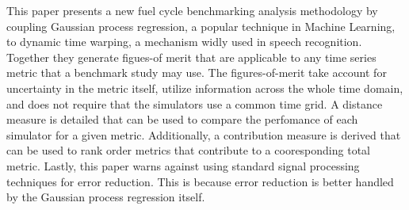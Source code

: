 This paper presents a new fuel cycle benchmarking analysis methodology
by coupling Gaussian process regression, a popular technique in Machine 
Learning, to dynamic time warping, a mechanism widly used in speech 
recognition. Together they generate figues-of merit that are applicable to
any time series metric that a benchmark study may use. The figures-of-merit
take account for uncertainty in the metric itself, utilize information
across the whole time domain, and does not require that the simulators
use a common time grid. A distance measure is detailed that can be used to 
compare the perfomance of each simulator for a given metric. Additionally, 
a contribution measure is derived that can be used to rank order metrics
that contribute to a cooresponding total metric. Lastly, this paper 
warns against using standard signal processing techniques for error reduction.
This is because error reduction is better handled by the Gaussian process 
regression itself.